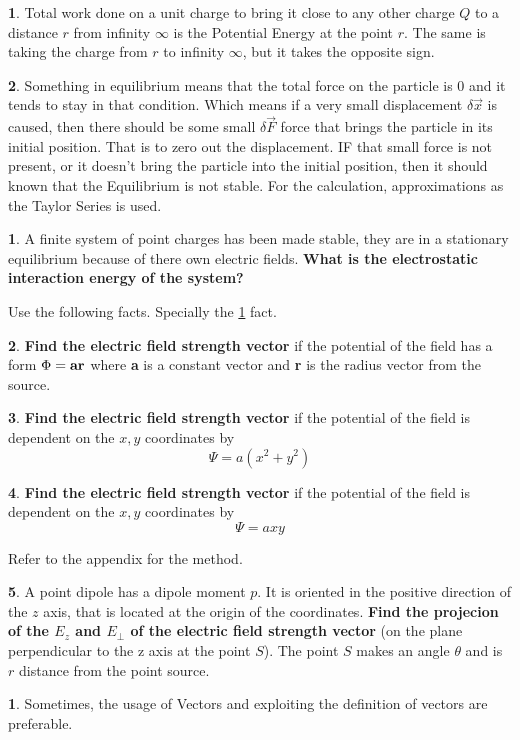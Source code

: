 \documentclass[11pt,a4paper,landscape,twocolumn]{article}
\theoremstyle{definition}
\newtheorem{fct}{ \framebox[0.05\textwidth]{{\sffamily Fact}} }
\theoremstyle{definition}
\newtheorem{pr}{ \framebox[0.05\textwidth]{{\sffamily Pr}} }
\theoremstyle{definition}
\newtheorem{idea}{ \framebox[0.05\textwidth]{{\sffamily Idea}} }
\theoremstyle{definition}
\begin{document}
 
\begin{fct} \label{potsdist}
Total work done on a unit charge to bring it close to any other charge $Q$ to a distance $r$ from infinity $\infty$ is the Potential Energy at the point $r$. The same is taking the charge from $r$ to infinity $\infty$, but it takes the opposite sign. \end{fct}
\begin{fct} \label{equilibrium}
Something in equilibrium means that the total force on the particle is 0 and it tends to stay in that condition. Which means if a very small displacement $\delta \vec{x}$ is caused, then there should be some small $\delta \vec{F}$ force that brings the particle in its initial position. That is to zero out the displacement. IF that small force is not present, or it doesn't bring the particle into the initial position, then it should known that the Equilibrium is not stable. For the calculation, approximations as the Taylor Series is used. 
\end{fct}
%
%
 \begin{pr}
 A finite system of point charges has been made stable, they are in a stationary equilibrium because of there own electric fields. \textbf{What is the electrostatic interaction energy of the system?}
 \end{pr}
Use the following facts. Specially the \ref{potsdist} fact.
%
%
\begin{pr} \label{pr5}
\textbf{Find the electric field strength vector} if the potential of the field has a form $\Phi = \text{\textbf{ar}}$ where \textbf{a} is a constant vector and \textbf{r} is the radius vector from the source.
\end{pr}
%
%
\begin{pr} \label{pr6}
\textbf{Find the electric field strength vector} if the potential of the field is dependent on the $x,y$ coordinates by 
\[ \Psi = a (x^2 + y^2) \]
\end{pr}
%
\begin{pr} \label{pr7}
\textbf{Find the electric field strength vector} if the potential of the field is dependent on the $x,y$ coordinates by 
\[ \Psi = axy \]
\end{pr}
%
Refer to the appendix for the method.
%
\begin{pr}
A point dipole has a dipole moment $p$. It is oriented in the positive direction of the $z$ axis, that is located at the origin of the coordinates. \textbf{Find the projecion of the $E_z$ and $E_{\perp}$ of the electric field strength vector} (on the plane perpendicular to the z axis at the point $S$). The point $S$ makes an angle $\theta$ and is $r$ distance from the point source.
\end{pr}
%
%
\begin{idea}
Sometimes, the usage of Vectors and exploiting the definition of vectors are preferable.
\end{idea}
\end{document}
